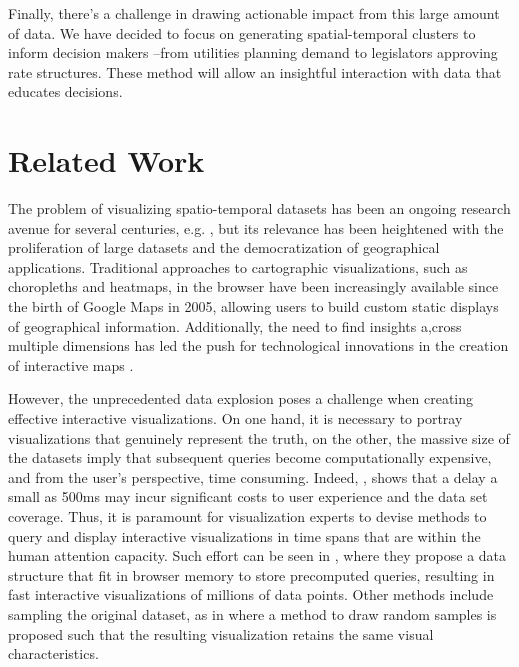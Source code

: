 \documentclass[letterpaper, 12 pt, conference]{ieeeconf}  %
\begin{document}
Finally, there’s a challenge in drawing actionable impact from this large amount of data. We have decided to focus on generating spatial-temporal clusters to inform decision makers –from utilities planning demand to legislators approving rate structures. These method will allow an insightful interaction with data that educates decisions.


\section{Related Work}





The problem of visualizing spatio-temporal datasets has been an ongoing research avenue for several centuries, e.g. \cite{minard1869tableaux}, but its relevance has been heightened with the proliferation of large datasets and the democratization of geographical applications. Traditional approaches to cartographic visualizations, such as choropleths and heatmaps, in the browser have been increasingly available since the birth of Google Maps in 2005, allowing users to build custom static displays of geographical information. Additionally, the need to find insights a,cross multiple dimensions has led the push for technological innovations in the creation of interactive maps \cite{leaflet,mapbox,2011-d3}. 


However, the unprecedented data explosion poses a challenge when creating effective interactive visualizations. On one hand, it is necessary to portray visualizations that genuinely represent the truth, on the other, the massive size of the datasets imply that subsequent queries become computationally expensive, and from the user’s perspective, time consuming. Indeed, \cite{liu2014effects}, shows that a delay a small as 500ms may incur significant costs to user experience and the data set coverage. Thus, it is paramount for visualization experts to devise methods to query and display interactive visualizations in time spans that are within the human attention capacity. Such effort can be seen in \cite{lins2013nanocubes}, where they propose a data structure that fit in browser memory to store precomputed queries, resulting in fast interactive visualizations of millions of data points. Other methods include sampling the original dataset, as in \cite{park2015visualization} where a method to draw random samples is proposed such that the resulting visualization retains the same visual characteristics.
\end{document}
